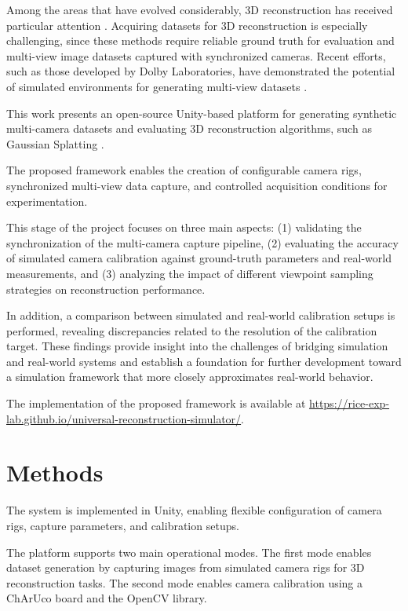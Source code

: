 \documentclass[conference]{IEEEtran}
\begin{document}
Among the areas that have evolved considerably, 3D reconstruction has received particular attention \cite{overview}. Acquiring datasets for 3D reconstruction is especially challenging, since these methods require reliable ground truth for evaluation and multi-view image datasets captured with synchronized cameras. Recent efforts, such as those developed by Dolby Laboratories, have demonstrated the potential of simulated environments for generating multi-view datasets \cite{volucapture}.

This work presents an open-source Unity-based platform for generating synthetic multi-camera datasets and evaluating 3D reconstruction algorithms, such as Gaussian Splatting \cite{3dgs}. 

The proposed framework enables the creation of configurable camera rigs, synchronized multi-view data capture, and controlled acquisition conditions for experimentation.

This stage of the project focuses on three main aspects: (1) validating the synchronization of the multi-camera capture pipeline, (2) evaluating the accuracy of simulated camera calibration against ground-truth parameters and real-world measurements, and (3) analyzing the impact of different viewpoint sampling strategies on reconstruction performance.

In addition, a comparison between simulated and real-world calibration setups is performed, revealing discrepancies related to the resolution of the calibration target. These findings provide insight into the challenges of bridging simulation and real-world systems and establish a foundation for further development toward a simulation framework that more closely approximates real-world behavior.

The implementation of the proposed framework is available at
\href{https://rice-exp-lab.github.io/universal-reconstruction-simulator/}{https://rice-exp-lab.github.io/universal-reconstruction-simulator/}.


\section{Methods}

The system is implemented in Unity, enabling flexible configuration of camera rigs, capture parameters, and calibration setups.

The platform supports two main operational modes. The first mode enables dataset generation by capturing images from simulated camera rigs for 3D reconstruction tasks. The second mode enables camera calibration using a ChArUco board and the OpenCV library.
\end{document}
